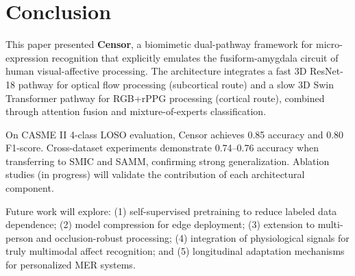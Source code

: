 
\section{Conclusion}
\label{sec:conclusion}

This paper presented \textbf{Censor}, a biomimetic dual-pathway framework for micro-expression recognition that explicitly emulates the fusiform-amygdala circuit of human visual-affective processing. The architecture integrates a fast 3D ResNet-18 pathway for optical flow processing (subcortical route) and a slow 3D Swin Transformer pathway for RGB+rPPG processing (cortical route), combined through attention fusion and mixture-of-experts classification.

On CASME II 4-class LOSO evaluation, Censor achieves 0.85 accuracy and 0.80 F1-score. Cross-dataset experiments demonstrate 0.74--0.76 accuracy when transferring to SMIC and SAMM, confirming strong generalization. Ablation studies (in progress) will validate the contribution of each architectural component.

Future work will explore: (1) self-supervised pretraining to reduce labeled data dependence; (2) model compression for edge deployment; (3) extension to multi-person and occlusion-robust processing; (4) integration of physiological signals for truly multimodal affect recognition; and (5) longitudinal adaptation mechanisms for personalized MER systems.